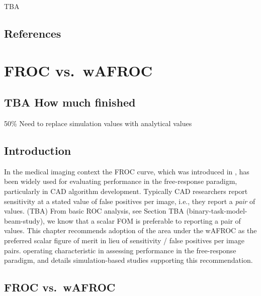 \documentclass[
]{book}
\begin{document}
TBA

\hypertarget{froc-empirical-examples-references}{%
\section{References}\label{froc-empirical-examples-references}}

\hypertarget{froc-vs-wafroc}{%
\chapter{FROC vs.~wAFROC}\label{froc-vs-wafroc}}

\hypertarget{froc-vs-wafroc-how-much-finished}{%
\section{TBA How much finished}\label{froc-vs-wafroc-how-much-finished}}

50\%
Need to replace simulation values with analytical values

\hypertarget{froc-vs-wafroc-intro}{%
\section{Introduction}\label{froc-vs-wafroc-intro}}

In the medical imaging context the FROC curve, which was introduced in \citep{bunch1977free}, has been widely used for evaluating performance in the free-response paradigm, particularly in CAD algorithm development. Typically CAD researchers report sensitivity at a stated value of false positives per image, i.e., they report a \emph{pair} of values. (TBA) From basic ROC analysis, see Section TBA (binary-task-model-beam-study), we know that a scalar FOM is preferable to reporting a pair of values. This chapter recommends adoption of the area under the wAFROC as the preferred scalar figure of merit in lieu of sensitivity / false positives per image pairs. operating characteristic in assessing performance in the free-response paradigm, and details simulation-based studies supporting this recommendation.

\hypertarget{froc-vs.-wafroc}{%
\section{FROC vs.~wAFROC}\label{froc-vs.-wafroc}}
\end{document}
